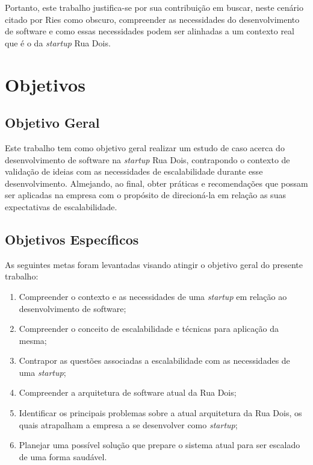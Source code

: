 Portanto, este trabalho justifica-se por sua contribuição em buscar, neste
cenário citado por Ries como obscuro, compreender as necessidades do desenvolvimento
de software e como essas necessidades podem ser alinhadas a um contexto real
que é o da \textit{startup} Rua Dois.

\section{Objetivos}

\subsection{Objetivo Geral}

Este trabalho tem como objetivo geral realizar um estudo de caso acerca do
desenvolvimento de software na \textit{startup} Rua Dois, contrapondo o contexto de
validação de ideias com as necessidades de escalabilidade durante esse
desenvolvimento. Almejando, ao final, obter práticas e recomendações que possam
ser aplicadas na empresa com o propósito de direcioná-la em relação as suas
expectativas de escalabilidade.

\subsection{Objetivos Específicos}

As seguintes metas foram levantadas visando atingir o objetivo geral do presente
trabalho:

  \begin{enumerate}
    \item Compreender o contexto e as necessidades de uma \textit{startup} em
    relação ao desenvolvimento de software;
    \item Compreender o conceito de escalabilidade e técnicas para aplicação
    da mesma;
    \item Contrapor as questões associadas a escalabilidade com as necessidades
    de uma \textit{startup};
    \item Compreender a arquitetura de software atual da Rua Dois;
    \item Identificar os principais problemas sobre a atual arquitetura da Rua
    Dois, os quais atrapalham a empresa a se desenvolver como \textit{startup};
    \item Planejar uma possível solução que prepare o sistema atual para ser
    escalado de uma forma saudável.
  \end{enumerate}

